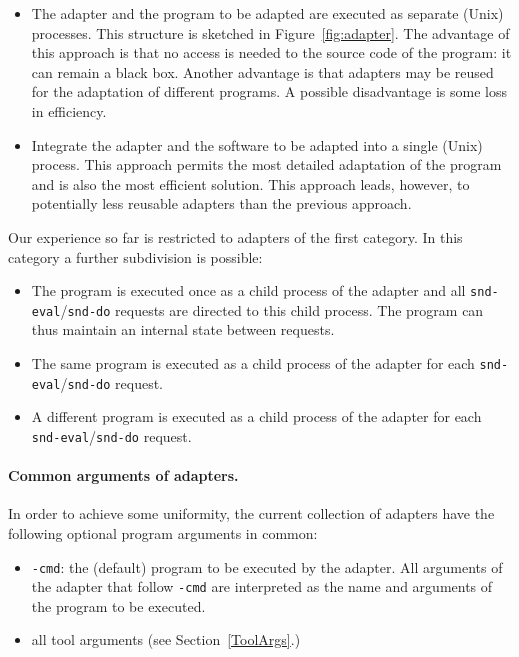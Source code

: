\begin{itemize}
\item The adapter and the program to be adapted are executed as separate
(Unix) processes. This structure is sketched in Figure~\ref{fig:adapter}.
The advantage of this approach is that no access is
needed to the source code of the program: it can remain a black box.
Another advantage is that adapters may be reused for the adaptation of
different programs. A possible disadvantage is some loss in
efficiency.

\item Integrate the adapter and the software to be adapted into a single
(Unix) process. This approach permits the most detailed adaptation of
the program and is also the most efficient solution. This approach
leads, however, to potentially less reusable adapters than the
previous approach.

\end{itemize}

Our experience so far is restricted to adapters of the first category.
In this category a further subdivision is possible:
\begin{itemize}
\item The program is executed once as a child process of the adapter
and all {\tt snd-eval}/{\tt snd-do} requests are directed to this child process.
The program can thus maintain an internal state between requests.

\item The same program is executed as a child process of the adapter
for each {\tt snd-eval}/{\tt snd-do} request.

\item A different program is executed as a child process of the adapter
for each {\tt snd-eval}/{\tt snd-do} request.

\end{itemize}

\paragraph{Common arguments of adapters.} In order to achieve some uniformity,
the current collection of adapters have the following optional program arguments
in common:

\begin{itemize}

\item {\tt -cmd}: the (default) program to be executed by the adapter.
All arguments of the adapter that follow {\tt -cmd} are interpreted as
the name and arguments of the program to be executed.

\item all tool arguments (see Section~\ref{ToolArgs}.)
\end{itemize}

